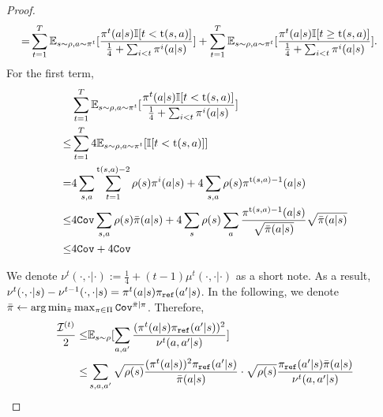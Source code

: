 \begin{proof}
\begin{align*}
        =&\sum_{t=1}^T\mathbb{E}_{s\sim\rho, a\sim\pi^t}[\frac{\pi^t(a|s) {\mathbb{I}}[t < \text{t}(s,a)]}{\frac{1}{4} + \sum_{i<t}\pi^i(a|s)}] + \sum_{t=1}^T\mathbb{E}_{s\sim\rho, a\sim\pi^t}[\frac{\pi^t(a|s){\mathbb{I}}[t \geq \text{t}(s,a)]}{\frac{1}{4} + \sum_{i<t}\pi^i(a|s)}].
    \end{align*}
    For the first term,
    \begin{align*}
        & \sum_{t=1}^T\mathbb{E}_{s\sim\rho, a\sim\pi^t}[\frac{\pi^t(a|s) {\mathbb{I}}[t < \text{t}(s,a)]}{\frac{1}{4} + \sum_{i<t}\pi^i(a|s)}] \\
        \leq & \sum_{t=1}^T 4 \mathbb{E}_{s\sim\rho, a\sim\pi^t}[{\mathbb{I}}[t < \text{t}(s,a)]] \\
        =& 4 \sum_{s,a} \sum_{t=1}^{\text{t}(s,a)-2} \rho(s)\pi^i(a|s) + 4 \sum_{s,a} \rho(s) \pi^{\text{t}(s,a)-1}(a|s) \\
        \leq & 4 {\texttt{Cov}} \sum_{s,a}\rho(s) \bar{\pi}(a|s) + 4 \sum_{s}\rho(s) \sum_a \frac{\pi^{\text{t}(s,a)-1}(a|s)}{\sqrt{\bar{\pi}(a|s)}}\sqrt{\bar{\pi}(a|s)} \\
        \leq & 4{\texttt{Cov}} + 4{\texttt{Cov}}^{}
    \end{align*}


    We denote $\nu^t(\cdot,\cdot|\cdot) := \frac{1}{4} + (t-1)\mu^t(\cdot,\cdot|\cdot)$ as a short note. As a result, $\nu^t(\cdot,\cdot|s) - \nu^{t-1}(\cdot,\cdot|s) = \pi^t(a|s)\pi_{\texttt{ref}}(a'|s)$. 
    In the following, we denote $\bar{\pi} \gets \arg\min_{\bar{\pi}} \max_{\pi \in \Pi} {\texttt{Cov}}^{\bar{\pi}|\pi}$.
    Therefore,
    \begin{align*}
        \frac{\mathcal{I}^{(t)}}{2} \leq & \mathbb{E}_{s\sim\rho}[\sum_{a,a'} \frac{(\pi^t(a|s)\pi_{\texttt{ref}}(a'|s))^2}{\nu^t(a,a'|s)}] \\
        \leq & \sum_{s,a,a'} \sqrt{\rho(s)} \frac{(\pi^t(a|s))^2\pi_{\texttt{ref}}(a'|s)}{\bar{\pi}(a|s)} \cdot \sqrt{\rho(s)} \frac{\pi_{\texttt{ref}}(a'|s)\bar{\pi}(a|s)}{\nu^t(a,a'|s)}
    \end{align*}


\end{proof}
